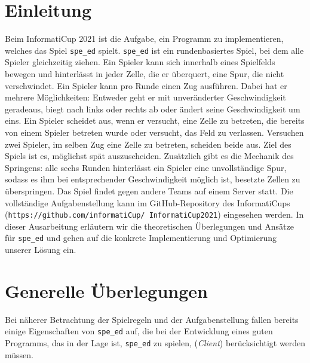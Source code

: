 \documentclass[12pt,a4paper]{article}
\begin{document}
\listoffigures
\thispagestyle{empty}
\newpage

\setcounter{page}{1}


\section{Einleitung}
Beim InformatiCup 2021 ist die Aufgabe, ein Programm zu implementieren, welches das Spiel \texttt{spe\_ed} spielt. \texttt{spe\_ed} ist ein rundenbasiertes Spiel, bei dem alle Spieler gleichzeitig ziehen. Ein Spieler kann sich innerhalb eines Spielfelds bewegen und hinterlässt in jeder Zelle, die er überquert, eine Spur, die nicht verschwindet. Ein Spieler kann pro Runde einen Zug ausführen. Dabei hat er mehrere Möglichkeiten: Entweder geht er mit unveränderter Geschwindigkeit geradeaus, biegt nach links oder rechts ab oder ändert seine Geschwindigkeit um eins. Ein Spieler scheidet aus, wenn er versucht, eine Zelle zu betreten, die bereits von einem Spieler betreten wurde oder versucht, das Feld zu verlassen. Versuchen zwei Spieler, im selben Zug eine Zelle zu betreten, scheiden beide aus. Ziel des Spiels ist es, möglichst spät auszuscheiden. Zusätzlich gibt es die Mechanik des Springens: alle sechs Runden hinterlässt ein Spieler eine unvollständige Spur, sodass es ihm bei entsprechender Geschwindigkeit möglich ist, besetzte Zellen zu überspringen. Das Spiel findet gegen andere Teams auf einem Server statt. Die vollständige Aufgabenstellung kann im GitHub-Repository des InformatiCups (\texttt{https://github.com/informatiCup/\ InformatiCup2021}) eingesehen werden. In dieser Ausarbeitung erläutern wir die theoretischen Überlegungen und Ansätze für \texttt{spe\_ed} und gehen auf die konkrete Implementierung und Optimierung unserer Lösung ein. 

\section{Generelle Überlegungen}
Bei näherer Betrachtung der Spielregeln und der Aufgabenstellung fallen bereits einige Eigenschaften von \texttt{spe\_ed} auf, die bei der Entwicklung eines guten Programms, das in der Lage ist, \texttt{spe\_ed} zu spielen, (\textit{Client}) berücksichtigt werden müssen.
\end{document}
